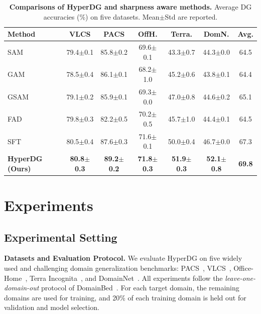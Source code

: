 \documentclass[10pt]{article} %
\begin{document}
\begin{table}[t]
\centering
\caption{\textbf{Comparisons of HyperDG and sharpness aware methods.} 
Average DG accuracies (\%) on five datasets. Mean$\pm$Std are reported.}
\label{tab:sharpness}
\setlength{\tabcolsep}{1.6pt}
\renewcommand{\arraystretch}{1.02}
\footnotesize
\begin{tabular}{lcccccc}
\toprule
\textbf{Method} & \textbf{VLCS} & \textbf{PACS} & \textbf{OffH.} & \textbf{Terra.} & \textbf{DomN.} & \textbf{Avg.} \\
\midrule
SAM  & 79.4{\tiny$\pm$0.1} & 85.8{\tiny$\pm$0.2} & 69.6{\tiny$\pm$0.1} & 43.3{\tiny$\pm$0.7} & 44.3{\tiny$\pm$0.0} & 64.5 \\
GAM & 78.5{\tiny$\pm$0.4} & 86.1{\tiny$\pm$0.1} & 68.2{\tiny$\pm$1.0} & 45.2{\tiny$\pm$0.6} & 43.8{\tiny$\pm$0.1} & 64.4 \\
GSAM & 79.1{\tiny$\pm$0.2} & 85.9{\tiny$\pm$0.1} & 69.3{\tiny$\pm$0.0} & 47.0{\tiny$\pm$0.8} & 44.6{\tiny$\pm$0.2} & 65.1 \\
FAD & 79.8{\tiny$\pm$0.3} & 82.2{\tiny$\pm$0.5} & 70.2{\tiny$\pm$0.5} & 45.7{\tiny$\pm$1.0} & 44.4{\tiny$\pm$0.1} & 64.5 \\
SFT & 80.5{\tiny$\pm$0.4} & 87.6{\tiny$\pm$0.3} & 71.6{\tiny$\pm$0.1} & 50.0{\tiny$\pm$0.4} & 46.7{\tiny$\pm$0.0} & 67.3 \\
\textbf{HyperDG (Ours)} & \textbf{80.8{\tiny$\pm$0.3}} & \textbf{89.2{\tiny$\pm$0.2}} & \textbf{71.8{\tiny$\pm$0.3}} & \textbf{51.9{\tiny$\pm$0.3}} & \textbf{52.1{\tiny$\pm$0.8}} & \textbf{69.8} \\
\bottomrule
\end{tabular}
\end{table}



\section{Experiments}
\subsection{Experimental Setting}

\textbf{Datasets and Evaluation Protocol.}
We evaluate HyperDG on five widely used and challenging domain generalization benchmarks: 
PACS~\cite{li2017deeper}, 
VLCS~\cite{fang2013unbiased}, 
Office-Home~\cite{venkateswara2017deep}, 
Terra Incognita~\cite{beery2018recognition}, 
and DomainNet~\cite{peng2019moment}.  
All experiments follow the \emph{leave-one-domain-out} protocol of DomainBed~\cite{gulrajani2020search}.  
For each target domain, the remaining domains are used for training, and 20\% of each training domain is held out for validation and model selection.  
\end{document}
